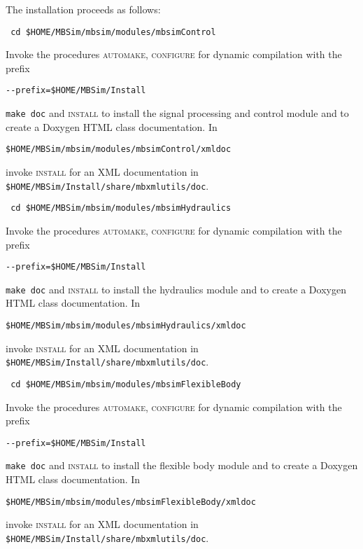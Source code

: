 The installation proceeds as follows:
\begin{verbatim}
 cd $HOME/MBSim/mbsim/modules/mbsimControl
\end{verbatim}
Invoke the procedures \textsc{automake, configure} for dynamic compilation with the prefix
\begin{verbatim}
--prefix=$HOME/MBSim/Install
\end{verbatim}
\texttt{make doc} and \textsc{install} to install the signal processing and control module and to create a Doxygen HTML class documentation. In 
\begin{verbatim}
$HOME/MBSim/mbsim/modules/mbsimControl/xmldoc
\end{verbatim}
invoke \textsc{install} for an XML documentation in \texttt{\$HOME/MBSim/Install/share/mbxmlutils/doc}.\vspace{5mm}
\begin{verbatim}
 cd $HOME/MBSim/mbsim/modules/mbsimHydraulics
\end{verbatim}
Invoke the procedures \textsc{automake, configure} for dynamic compilation with the prefix
\begin{verbatim}
--prefix=$HOME/MBSim/Install
\end{verbatim}
\texttt{make doc} and \textsc{install} to install the hydraulics module and to create a Doxygen HTML class documentation. In 
\begin{verbatim}
$HOME/MBSim/mbsim/modules/mbsimHydraulics/xmldoc
\end{verbatim}
invoke \textsc{install} for an XML documentation in \texttt{\$HOME/MBSim/Install/share/mbxmlutils/doc}.\vspace{5mm}
\begin{verbatim}
 cd $HOME/MBSim/mbsim/modules/mbsimFlexibleBody
\end{verbatim}
Invoke the procedures \textsc{automake, configure} for dynamic compilation with the prefix
\begin{verbatim}
--prefix=$HOME/MBSim/Install
\end{verbatim}
\texttt{make doc} and \textsc{install} to install the flexible body module and to create a Doxygen HTML class documentation. In 
\begin{verbatim}
$HOME/MBSim/mbsim/modules/mbsimFlexibleBody/xmldoc
\end{verbatim}
invoke \textsc{install} for an XML documentation in \texttt{\$HOME/MBSim/Install/share/mbxmlutils/doc}.\vspace{5mm}

